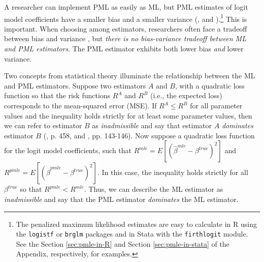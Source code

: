 \documentclass[12pt]{article}
\begin{document}
A researcher can implement PML as easily as ML, but PML estimates of logit model coefficients have a smaller bias \citep{Firth1993} and a smaller variance (\citealt[p. 49]{Kosmidis2007}, and \citealt{Copas1988}).\footnote{The penalized maximum likelihood estimates are easy to calculate in R using the \texttt{logistf} or \texttt{brglm} packages and in Stata with the \texttt{firthlogit} module. 
See the Section \ref{sec:pmle-in-R} and Section \ref{sec:pmle-in-stata} of the Appendix, respectively, for examples.}
This is important.
When choosing among estimators, researchers often face a tradeoff between bias and variance \citep[pp. 37-38]{HastieTibshiraniFriedman2013}, but \textit{there is no bias-variance tradeoff between ML and PML estimators}.
The PML estimator exhibits both lower bias \textit{and} lower variance.

Two concepts from statistical theory illuminate the relationship between the ML and PML estimators. 
Suppose two estimators $A$ and $B$, with a quadratic loss function so that the risk functions $R^A$ and $R^B$ (i.e., the expected loss) corresponds to the mean-squared error (MSE). 
If $R^A \leq R^B$ for all parameter values and the inequality holds strictly for at least some parameter values, then we can refer to estimator $B$ as \textit{inadmissible} and say that estimator $A$ \textit{dominates} estimator $B$ (\citealt{DeGrootSchervish2012}, p. 458, and \citealt{LeonardHsu1999}, pp. 143-146). 
Now suppose a quadratic loss function for the logit model coefficients, such that $R^{mle} = E[(\hat{\beta}^{mle} - \beta^{true})^2]$ and $R^{pmle} = E[(\hat{\beta}^{pmle} - \beta^{true})^2]$. 
In this case, the inequality holds strictly for all $\beta^{true}$ so that $R^{pmle} < R^{mle}$. Thus, we can describe the ML estimator as \textit{inadmissible} and say that the PML estimator \textit{dominates} the ML estimator.
\end{document}
